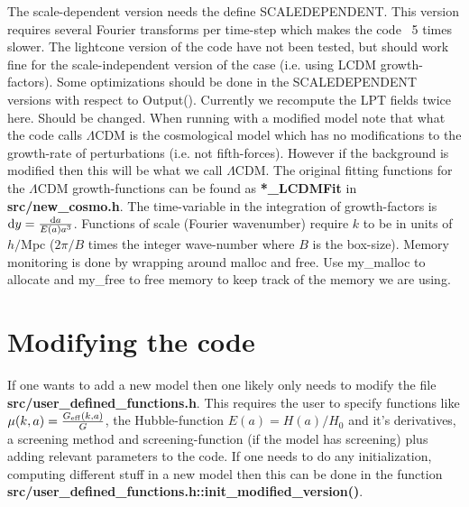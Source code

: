 \documentclass[usenatbib]{article}
\begin{document}
The scale-dependent version needs the define SCALEDEPENDENT. This version requires several Fourier transforms per time-step which makes the code ~5 times slower.
\newline
\newline
The lightcone version of the code have not been tested, but should work fine for the scale-independent version of the case (i.e. using LCDM growth-factors).
\newline
\newline
Some optimizations should be done in the SCALEDEPENDENT versions with respect to Output(). Currently we recompute the LPT fields twice here. Should be changed.
\newline
\newline
When running with a modified model note that what the code calls $\Lambda$CDM is the cosmological model which has no modifications to the growth-rate of perturbations (i.e. not fifth-forces). However if the background is modified then this will be what we call $\Lambda$CDM.
\newline
\newline
The original fitting functions for the $\Lambda$CDM growth-functions can be found as \textbf{*\_LCDMFit} in \textbf{src/new\_cosmo.h}.
\newline
\newline
The time-variable in the integration of growth-factors is ${\rm d}y = \frac{{\rm d}a}{E(a)a^3}$.
\newline
\newline
Functions of scale (Fourier wavenumber) require $k$ to be in units of $h/$Mpc ($2\pi/B$ times the integer wave-number where $B$ is the box-size).
\newline
\newline
Memory monitoring is done by wrapping around malloc and free. Use my\_malloc to allocate and my\_free to free memory to keep track of the memory we are using.

\section*{Modifying the code}

If one wants to add a new model then one likely only needs to modify the file \textbf{src/user\_defined\_functions.h}. This requires the user to specify functions like $\mu(k,a) = \frac{G_{\rm eff}(k,a)}{G}$, the Hubble-function $E(a) = H(a)/H_0$ and it's derivatives, a screening method and screening-function (if the model has screening) plus adding relevant parameters to the code.
\newline
\newline
If one needs to do any initialization, computing different stuff in a new model then this can be done in the function \textbf{src/user\_defined\_functions.h::init\_modified\_version()}.
\end{document}
